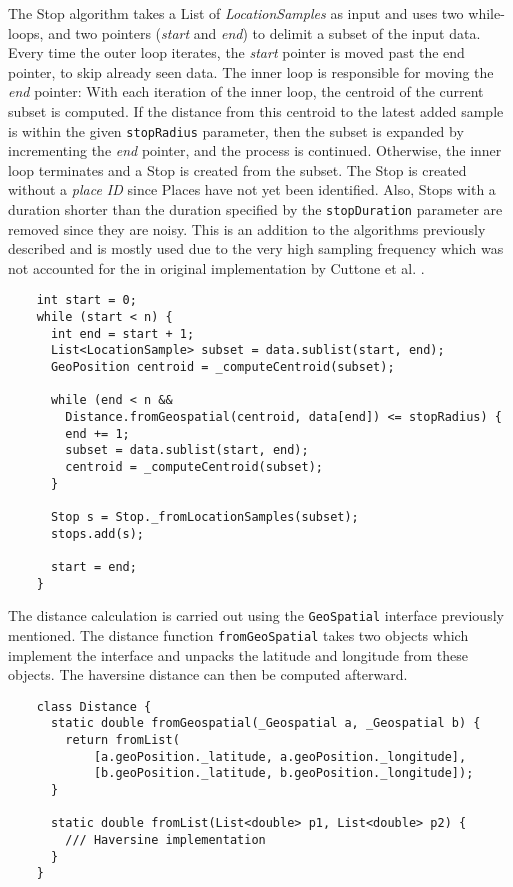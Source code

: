 The Stop algorithm takes a List of \textit{LocationSamples} as input and uses two while-loops, and two pointers (\textit{start} and \textit{end}) to delimit a subset of the input data. Every time the outer loop iterates, the \textit{start} pointer is moved past the end pointer, to skip already seen data. The inner loop is responsible for moving the \textit{end} pointer: With each iteration of the inner loop, the centroid of the current subset is computed. If the distance from this centroid to the latest added sample is within the given \verb|stopRadius| parameter, then the subset is expanded by incrementing the \textit{end} pointer, and the process is continued. Otherwise, the inner loop terminates and a Stop is created from the subset. The Stop is created without a \textit{place ID} since Places  have not yet been identified. Also, Stops with a duration shorter than the duration specified by the \verb|stopDuration| parameter are removed since they are noisy. This is an addition to the algorithms previously described and is mostly used due to the very high sampling frequency which was not accounted for the in original implementation by Cuttone et al. \cite{sparse-location-2014}.

\begin{verbatim}
    int start = 0;
    while (start < n) {
      int end = start + 1;
      List<LocationSample> subset = data.sublist(start, end);
      GeoPosition centroid = _computeCentroid(subset);
        
      while (end < n && 
        Distance.fromGeospatial(centroid, data[end]) <= stopRadius) {
        end += 1;
        subset = data.sublist(start, end);
        centroid = _computeCentroid(subset);
      }
    
      Stop s = Stop._fromLocationSamples(subset);
      stops.add(s);
    
      start = end;
    }
\end{verbatim}

The distance calculation is carried out using the \verb|GeoSpatial| interface previously mentioned. The distance function \verb|fromGeoSpatial| takes two objects which implement the interface and unpacks the latitude and longitude from these objects. The haversine distance can then be computed afterward.

\begin{verbatim}
    class Distance {
      static double fromGeospatial(_Geospatial a, _Geospatial b) {
        return fromList(
            [a.geoPosition._latitude, a.geoPosition._longitude],
            [b.geoPosition._latitude, b.geoPosition._longitude]);
      }
    
      static double fromList(List<double> p1, List<double> p2) {
        /// Haversine implementation
      }
    }
\end{verbatim}

